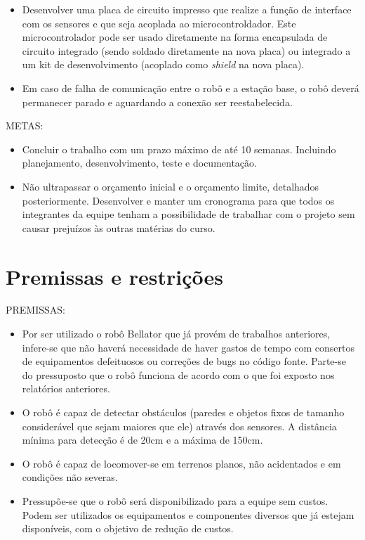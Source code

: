 \begin{itemize}
  \item Desenvolver uma placa de circuito impresso que realize a função de interface com os sensores e que seja acoplada ao microcontroldador. Este microcontrolador pode ser usado diretamente na forma encapsulada de circuito integrado (sendo soldado diretamente na nova placa) ou integrado a um kit de desenvolvimento (acoplado como \textit{shield} na nova placa).
  \item Em caso de falha de comunicação entre o robô e a estação base, o robô deverá permanecer parado e aguardando a conexão ser reestabelecida.
\end{itemize}

METAS:
\begin{itemize}
  \item Concluir o trabalho com um prazo máximo de até 10 semanas. Incluindo planejamento, desenvolvimento, teste e documentação. 
  \item Não ultrapassar o orçamento inicial e o orçamento limite, detalhados posteriormente.
Desenvolver e manter um cronograma para que todos os integrantes da equipe tenham a possibilidade de trabalhar com o projeto sem causar prejuízos às outras matérias do curso.
\end{itemize}

\chapter{Premissas e restrições}
PREMISSAS:
\begin{itemize}
  \item Por ser utilizado o robô Bellator que já provém de trabalhos anteriores, infere-se que não haverá necessidade de haver gastos de tempo com consertos de equipamentos defeituosos ou correções de bugs no código fonte. Parte-se do pressuposto que o robô funciona de acordo com o que foi exposto nos relatórios anteriores.
  \item O robô é capaz de detectar obstáculos (paredes e objetos fixos de tamanho considerável que sejam maiores que ele) através dos sensores. A distância mínima para detecção é de 20cm e a máxima de 150cm.
  \item O robô é capaz de locomover-se em terrenos planos, não acidentados e em condições não severas.
  \item Pressupõe-se que o robô será disponibilizado para a equipe sem custos.
Podem ser utilizados os equipamentos e componentes diversos que já estejam disponíveis, com o objetivo de redução de custos.
\end{itemize}

